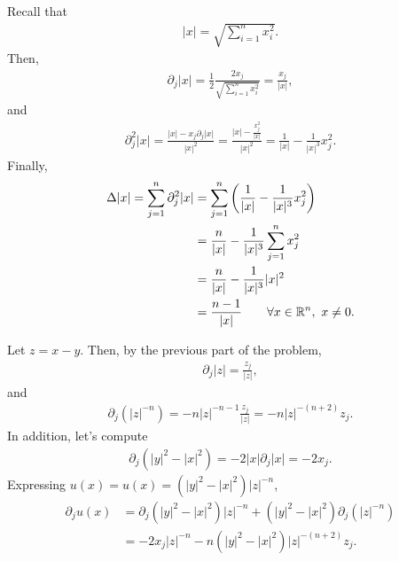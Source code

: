 \begin{questions}
\begin{solution}
Recall that 
\begin{align*}
|x|=\sqrt{\sum_{i=1}^nx_i^2}.
\end{align*}
Then,
\begin{align*}
\partial_j|x|=\frac{1}{2}\frac{2x_j}{\sqrt{\sum_{i=1}^nx_i^2}}=\frac{x_j}{|x|},
\end{align*}
and
\begin{align*}
\partial_j^2|x|=\frac{|x|-x_j\partial_j|x|}{|x|^2}=\frac{|x|-\frac{x_j^2}{|x|}}{|x|^2}=\frac{1}{|x|}-\frac{1}{|x|^3}x_j^2.
\end{align*}
Finally,
\begin{align*}
\Delta|x|=\sum_{j=1}^n\partial_j^2|x|&=\sum_{j=1}^n\left(\frac{1}{|x|}-\frac{1}{|x|^3}x_j^2\right)\\
&=\frac{n}{|x|}-\frac{1}{|x|^3}\sum_{j=1}^nx_j^2\\
&=\frac{n}{|x|}-\frac{1}{|x|^3}|x|^2\\
&=\frac{n-1}{|x|}~~~~~~\forall x\in\mathbb{R}^n,~x\neq 0.
\end{align*}
\end{solution}
\begin{solution}
Let $z=x-y$. Then, by the previous part of the problem,
\begin{align*}
\partial_j|z|=\frac{z_j}{|z|},
\end{align*}
and
\begin{align*}
\partial_j(|z|^{-n})=-n|z|^{-n-1}\frac{z_j}{|z|}=-n|z|^{-(n+2)}z_j.
\end{align*}
In addition, let's compute
\begin{align*}
\partial_j\left(|y|^2-|x|^2\right)=-2|x|\partial_j|x|=-2x_j.
\end{align*}
Expressing $u(x)=u(x)=\left(|y|^2-|x|^2\right)|z|^{-n}$,
\begin{align*}
\partial_ju(x)&=\partial_j\left(|y|^2-|x|^2\right)|z|^{-n}+\left(|y|^2-|x|^2\right)\partial_j\left(|z|^{-n}\right)\\
&=-2x_j|z|^{-n}-n\left(|y|^2-|x|^2\right)|z|^{-(n+2)}z_j.

\end{align*}
\end{solution}
\end{questions}
